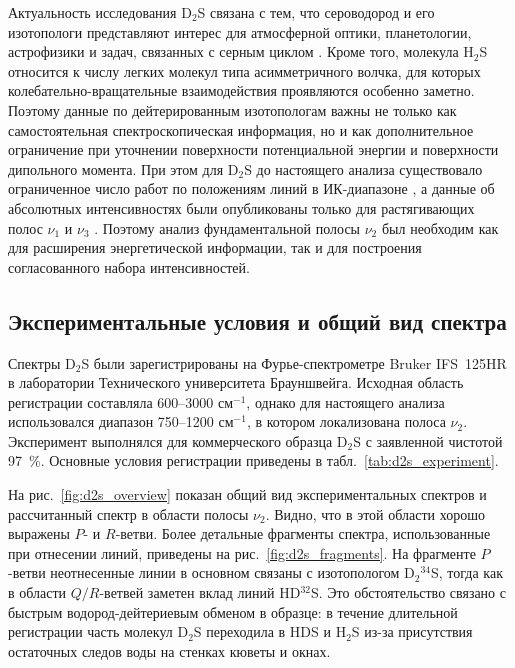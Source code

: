 Актуальность исследования D$_2$S связана с тем, что сероводород и его изотопологи представляют интерес
для атмосферной оптики, планетологии, астрофизики и задач, связанных с серным циклом
\cite{h2s_farquhar2000_science,h2s_farquhar2000_nature,h2s_thaddeus1972,h2s_vastel2003}. Кроме того,
молекула H$_2$S относится к числу легких молекул типа асимметричного волчка, для которых
колебательно-вращательные взаимодействия проявляются особенно заметно. Поэтому данные по
дейтерированным изотопологам важны не только как самостоятельная спектроскопическая информация, но и
как дополнительное ограничение при уточнении поверхности потенциальной энергии и поверхности
дипольного момента. При этом для D$_2$S до настоящего анализа существовало ограниченное число работ по
положениям линий в ИК-диапазоне \cite{d2s_gillis1985,d2s_camy1985,d2s_camy1988}, а данные об
абсолютных интенсивностях были опубликованы только для растягивающих полос $\nu_1$ и $\nu_3$
\cite{d2s_lamouroux2008}. Поэтому анализ фундаментальной полосы $\nu_2$ был необходим как для
расширения энергетической информации, так и для построения согласованного набора интенсивностей.

\subsection{Экспериментальные условия и общий вид спектра}

Спектры D$_2$S были зарегистрированы на Фурье-спектрометре Bruker IFS~125HR в лаборатории
Технического университета Брауншвейга. Исходная область регистрации составляла 600--3000 см$^{-1}$,
однако для настоящего анализа использовался диапазон 750--1200 см$^{-1}$, в котором локализована
полоса $\nu_2$. Эксперимент выполнялся для коммерческого образца D$_2$S с заявленной чистотой 97~\%.
Основные условия регистрации приведены в табл.~\ref{tab:d2s_experiment}.



На рис.~\ref{fig:d2s_overview} показан общий вид экспериментальных спектров и рассчитанный спектр в
области полосы $\nu_2$. Видно, что в этой области хорошо выражены $P$- и $R$-ветви. Более детальные
фрагменты спектра, использованные при отнесении линий, приведены на рис.~\ref{fig:d2s_fragments}. На
фрагменте $P$-ветви неотнесенные линии в основном связаны с изотопологом D$_2{}^{34}$S, тогда как в
области $Q/R$-ветвей заметен вклад линий HD$^{32}$S. Это обстоятельство связано с быстрым
водород-дейтериевым обменом в образце: в течение длительной регистрации часть молекул D$_2$S
переходила в HDS и H$_2$S из-за присутствия остаточных следов воды на стенках кюветы и окнах.

